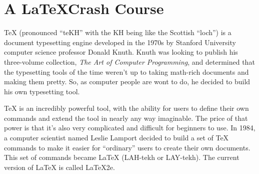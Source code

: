 %
%
%
%
%
%
%
%
%
%

\chapter{A \LaTeX Crash Course} \label{chap:crashcourse}

\TeX{} (pronounced ``teKH'' with the KH being like the Scottish ``loch'') is a
document typesetting engine developed in the 1970s by Stanford University
computer science professor Donald Knuth. Knuth was looking to publish his
three-volume collection, \emph{The Art of Computer Programming}, and
determined that the typesetting tools of the time weren't up to taking
math-rich documents and making them pretty. So, as computer people are wont to
do, he decided to build his own typesetting tool.

\TeX{} is an incredibly powerful tool, with the ability for users to define
their own commands and extend the tool in nearly any way imaginable. The price
of that power is that it's also very complicated and difficult for beginners
to use. In 1984, a computer scientist named Leslie Lamport decided to build a
set of \TeX{} commands to make it easier for ``ordinary'' users to create their
own documents. This set of commands became \LaTeX{} (LAH-tekh or LAY-tekh). The
current version of \LaTeX{} is called \LaTeX2e{}.

